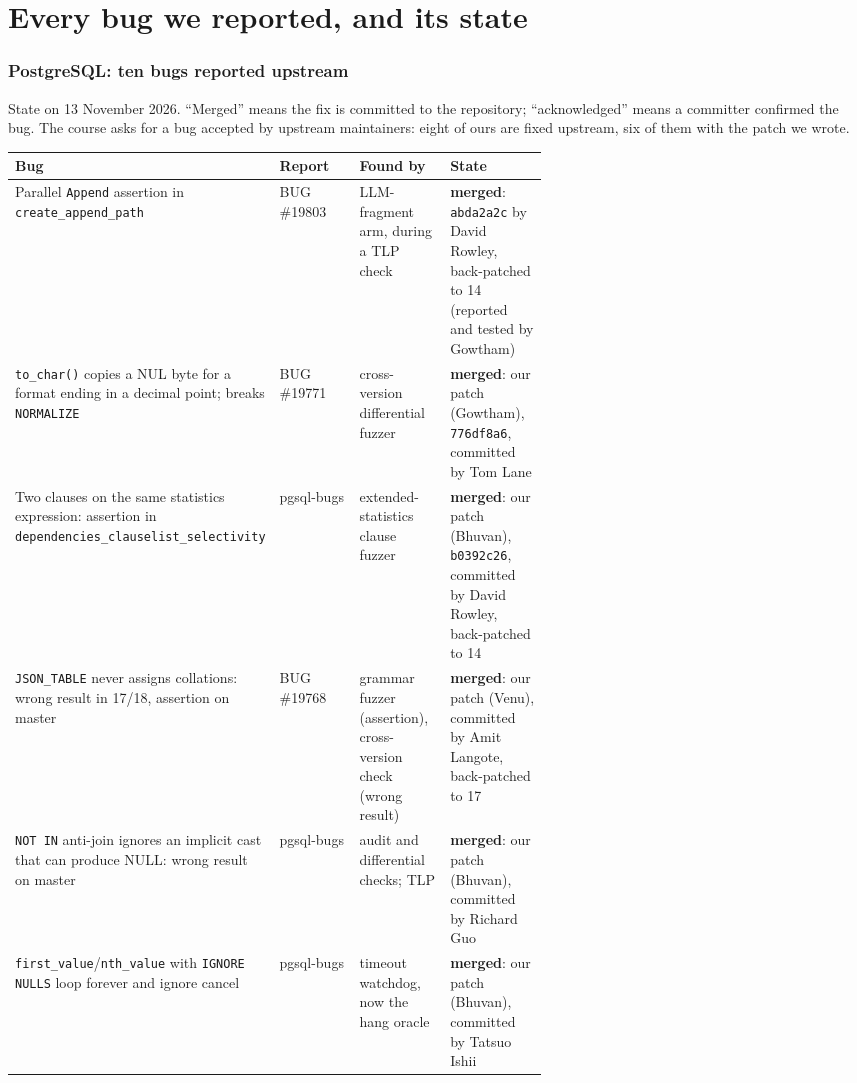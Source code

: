 \part{Every bug we reported, and its state}
\label{part:bugs}

\section{PostgreSQL: ten bugs reported upstream}

State on 13 November 2026. ``Merged'' means the fix is committed to the \pg
repository; ``acknowledged'' means a committer confirmed the bug. The course
asks for a bug accepted by upstream maintainers: eight of ours are fixed upstream,
six of them with the patch we wrote.

\begin{center}
\small
\begin{tabularx}{\linewidth}{@{}p{0.3\linewidth}p{0.15\linewidth}p{0.17\linewidth}X@{}}
\toprule
Bug & Report & Found by & State \\
\midrule
Parallel \texttt{Append} assertion in \texttt{create\_append\_path} & BUG \#19803 & LLM-fragment arm, during a TLP check & \textbf{merged}: \texttt{abda2a2c} by David Rowley, back-patched to 14 (reported and tested by Gowtham) \\
\texttt{to\_char()} copies a NUL byte for a format ending in a decimal point; breaks \texttt{NORMALIZE} & BUG \#19771 & cross-version differential fuzzer & \textbf{merged}: our patch (Gowtham), \texttt{776df8a6}, committed by Tom Lane \\
Two clauses on the same statistics expression: assertion in \texttt{dependencies\_clauselist\_selectivity} & pgsql-bugs & extended-statistics clause fuzzer & \textbf{merged}: our patch (Bhuvan), \texttt{b0392c26}, committed by David Rowley, back-patched to 14 \\
\texttt{JSON\_TABLE} never assigns collations: wrong result in 17/18, assertion on master & BUG \#19768 & grammar fuzzer (assertion), cross-version check (wrong result) & \textbf{merged}: our patch (Venu), committed by Amit Langote, back-patched to 17 \\
\texttt{NOT IN} anti-join ignores an implicit cast that can produce NULL: wrong result on master & pgsql-bugs & audit and differential checks; TLP & \textbf{merged}: our patch (Bhuvan), committed by Richard Guo \\
\texttt{first\_value}/\texttt{nth\_value} with \texttt{IGNORE NULLS} loop forever and ignore cancel & pgsql-bugs & timeout watchdog, now the hang oracle & \textbf{merged}: our patch (Bhuvan), committed by Tatsuo Ishii \\

\end{tabularx}
\end{center}

